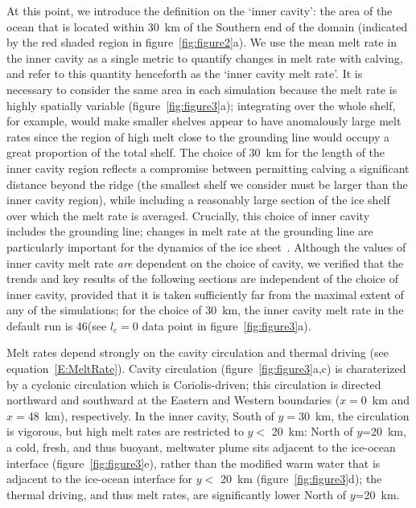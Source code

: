 \documentclass[draft]{agujournal2019}
\begin{document}
At this point, we introduce the definition on the `inner cavity': the area of the ocean that is located within 30~km of the Southern end of the domain (indicated by the red shaded region in figure~\ref{fig:figure2}a). We use the mean melt rate in the inner cavity as a single metric to quantify changes in melt rate with calving, and refer to this quantity henceforth as the `inner cavity melt rate'. It is necessary to consider the same area in each simulation because the melt rate is highly spatially variable (figure~\ref{fig:figure3}a); integrating over the whole shelf, for example, would make smaller shelves appear to have anomalously large melt rates since the region of high melt close to the grounding line would occupy a great proportion of the total shelf. %
The choice of 30~km for the length of the inner cavity region reflects a compromise between permitting calving a significant distance beyond the ridge (the smallest shelf we consider must be larger than the inner cavity region), while including a reasonably large section of the ice shelf over which the melt rate is averaged. Crucially, this choice of inner cavity includes the grounding line; changes in melt rate at the grounding line are particularly important for the dynamics of the ice sheet~\cite{Seroussi2014Cryo, Athern2017GRL}. Although the values of inner cavity melt rate \textit{are} dependent on the choice of cavity, we verified that the trends and key results of the following sections are independent of the choice of inner cavity, provided that it is taken sufficiently far from the maximal extent of any of the simulations; for the choice of 30~km, the inner cavity melt rate in the default run is 46\mpryr (see $l_c = 0$ data point in figure~\ref{fig:figure3}a).

Melt rates depend strongly on the cavity circulation and thermal driving (see equation~\eqref{E:MeltRate}). Cavity circulation (figure~\ref{fig:figure3}a,c) is charaterized by a cyclonic circulation which is Coriolis-driven;  this circulation is directed northward and southward at the Eastern and Western boundaries ($x=$0~km and $x=$48~km), respectively. In the inner cavity, South of $y = 30$~km, the circulation is vigorous, but high melt rates are restricted to $y<$ 20~km: North of $y$=20~km, a cold, fresh, and thus buoyant, meltwater plume sits adjacent to the ice-ocean interface (figure~\ref{fig:figure3}e), rather than the modified warm water that is adjacent to the ice-ocean interface for $y < $ 20~km  (figure~\ref{fig:figure3}d); the thermal driving, and thus melt rates, are significantly lower North of $y$=20~km.
\end{document}
